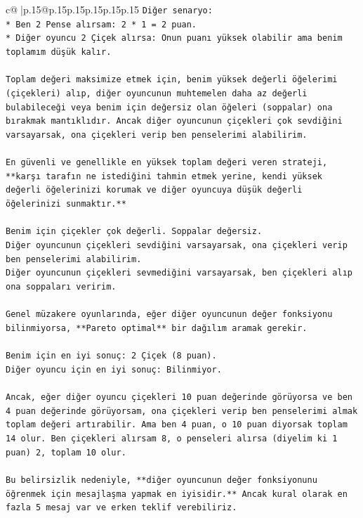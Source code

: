 \documentclass{article}
\begin{document}
{\begin{supertabular}{c@{$\;$}|p{.15\linewidth}@{}p{.15\linewidth}p{.15\linewidth}p{.15\linewidth}p{.15\linewidth}p{.15\linewidth}}
{{{\texttt{Diğer senaryo:} \\
\texttt{*   Ben 2 Pense alırsam: 2 * 1 = 2 puan.} \\
\texttt{*   Diğer oyuncu 2 Çiçek alırsa: Onun puanı yüksek olabilir ama benim toplamım düşük kalır.} \\
\\ 
\texttt{Toplam değeri maksimize etmek için, benim yüksek değerli öğelerimi (çiçekleri) alıp, diğer oyuncunun muhtemelen daha az değerli bulabileceği veya benim için değersiz olan öğeleri (soppalar) ona bırakmak mantıklıdır. Ancak diğer oyuncunun çiçekleri çok sevdiğini varsayarsak, ona çiçekleri verip ben penselerimi alabilirim.} \\
\\ 
\texttt{En güvenli ve genellikle en yüksek toplam değeri veren strateji, **karşı tarafın ne istediğini tahmin etmek yerine, kendi yüksek değerli öğelerinizi korumak ve diğer oyuncuya düşük değerli öğelerinizi sunmaktır.**} \\
\\ 
\texttt{Benim için çiçekler çok değerli. Soppalar değersiz.} \\
\texttt{Diğer oyuncunun çiçekleri sevdiğini varsayarsak, ona çiçekleri verip ben penselerimi alabilirim.} \\
\texttt{Diğer oyuncunun çiçekleri sevmediğini varsayarsak, ben çiçekleri alıp ona soppaları veririm.} \\
\\ 
\texttt{Genel müzakere oyunlarında, eğer diğer oyuncunun değer fonksiyonu bilinmiyorsa, **Pareto optimal** bir dağılım aramak gerekir.} \\
\\ 
\texttt{Benim için en iyi sonuç: 2 Çiçek (8 puan).} \\
\texttt{Diğer oyuncu için en iyi sonuç: Bilinmiyor.} \\
\\ 
\texttt{Ancak, eğer diğer oyuncu çiçekleri 10 puan değerinde görüyorsa ve ben 4 puan değerinde görüyorsam, ona çiçekleri verip ben penselerimi almak toplam değeri artırabilir. Ama ben 4 puan, o 10 puan diyorsak toplam 14 olur. Ben çiçekleri alırsam 8, o penseleri alırsa (diyelim ki 1 puan) 2, toplam 10 olur.} \\
\\ 
\texttt{Bu belirsizlik nedeniyle, **diğer oyuncunun değer fonksiyonunu öğrenmek için mesajlaşma yapmak en iyisidir.** Ancak kural olarak en fazla 5 mesaj var ve erken teklif verebiliriz.} \\
}}}
\end{supertabular}}
\end{document}
